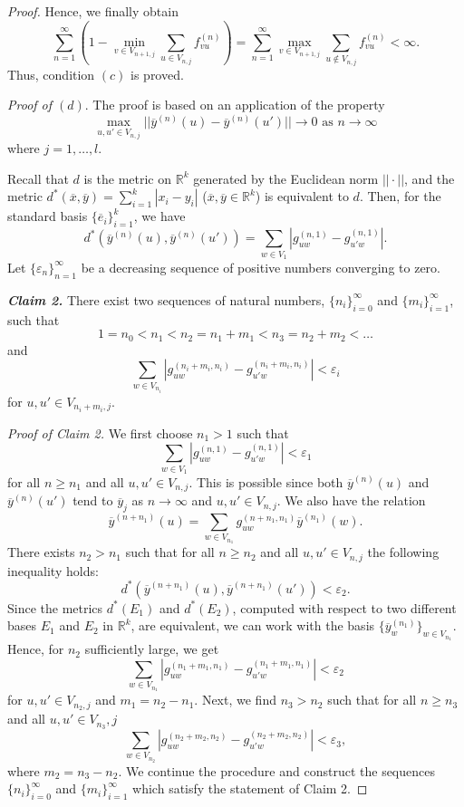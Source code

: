 \documentclass[11pt, english, reqno]{amsart}
\theoremstyle{definition}
\theoremstyle{remark}
\theoremstyle{plain}
\def\ov{\overline}
\numberwithin{equation}{section}
\begin{document}
{\begin{proof}
Hence, we finally obtain
$$
\sum_{n=1}^\infty \left(1 - \min_{v \in V_{n+1,j}} \sum_{u \in V_{n,j}}
f_{vu}^{(n)}\right) = \sum_{n=1}^\infty \max_{v \in V_{n+1,j}}\sum_{u
\notin V_{n,j}} f_{vu}^{(n)} < \infty.
$$
Thus, condition $(c)$ is proved.
\medskip

\textit{Proof of  $(d)$}. The proof is based on an application of the property
$$
\max_{u,u' \in V_{n,j}} || \ov y^{(n)}(u) - \ov y^{(n)}(u')|| \rightarrow 0
 \mbox { as } n \rightarrow \infty
$$
where $j = 1,\ldots,l$.

Recall that $d$ is the metric on $\mathbb R^k$  generated by the Euclidean
 norm $||\cdot||$, and the metric $ d^*(\ov x,\ov y) = \sum_{i=1}^k |x_i -
 y_i|$  ($\ov x, \ov y \in \mathbb R^k$)
is equivalent to $d$.  Then, for the
 standard  basis  $\{\ov e_i\}_{i = 1}^{k}$, we have
$$
d^*\left(\ov y^{(n)}(u),\ov y^{(n)}(u')\right) = \sum_{w \in V_1}\left|
g_{uw}^{(n,1)} - g_{u'w}^{(n,1)}\right|.
$$
Let $\{\varepsilon_n\}_{n=1}^\infty$ be a decreasing sequence of
positive numbers converging to zero.

\medskip
\textit{\textbf{Claim 2.}} There exist two sequences of natural numbers,
$\{n_i\}_{i = 0}^\infty$ and $\{m_i\}_{i = 1}^\infty$, such that
$$
1 = n_0 < n_1 < n_2 = n_1 + m_1 < n_3 = n_2 + m_2 < \ldots
$$
and
$$
\sum_{w \in V_{n_i}}\left|g_{uw}^{(n_i+m_i,n_i)} - g_{u'w}^{(n_i+m_i,n_i)}\right| <
 \varepsilon_i
$$
for $u,u' \in V_{n_i+m_i,j}$.
\medskip

\textit{Proof of Claim 2.}
We first choose $n_1>1$ such that
$$
\sum_{w\in V_{1}}\left|g_{uw}^{(n,1)} - g_{u'w}^{(n,1)}\right| < \varepsilon_1
$$
for all $n \geq n_1$ and all $u, u' \in V_{n,j}$. This is possible since both
$\ov y^{(n)}(u)$ and $\ov y^{(n)}(u')$ tend to $\ov y_j$ as $n \rightarrow
 \infty$  and $u,u' \in V_{n,j}$. We also have the relation
\begin{equation}\label{7a}
\ov y^{(n+n_1)}(u) = \sum_{w \in V_{n_1}} g_{uw}^{(n+n_1,n_1)} \ov
 y^{(n_1)}(w).
\end{equation}
There exists $n_2 > n_1$ such that for all $n \geq n_2$ and all $u,u' \in
 V_{n,j}$ the following inequality holds:
$$
d^*(\ov y^{(n+n_1)}(u),\ov y^{(n+n_1)}(u')) < \varepsilon_2.
$$
Since the metrics $d^*(E_1)$ and $d^*(E_2)$,  computed  with respect to
two different bases  $E_1$ and $E_2$ in
$\mathbb{R}^{k}$, are equivalent, we can work with the basis $\{\ov
 y_w^{(n_1)}\}_{w \in V_{n_1}}$. Hence, for $n_2$ sufficiently large, we
 get
$$
\sum_{w \in V_{n_1}}\left|g_{uw}^{(n_1 + m_1,n_1)} - g_{u'w}^{(n_1 +
m_1,n_1)}\right| < \varepsilon_2
$$
for $u,u' \in V_{n_2,j}$ and $m_1 = n_2 - n_1$.
Next, we find $n_3 > n_2$ such that for all $n \geq n_3$ and all $u,u' \in
V_{n_3},j$
$$
\sum_{w \in V_{n_2}}\left|g_{uw}^{(n_2 + m_2,n_2)} - g_{u'w}^{(n_2 +
m_2,n_2)}\right| < \varepsilon_3,
$$
where $m_2 = n_3 - n_2$. We continue the procedure and construct the
sequences
$\{n_i\}_{i = 0}^{\infty}$ and  $\{m_i\}_{i = 1}^{\infty}$
which satisfy the statement of Claim 2.


\end{proof}}
\end{document}

